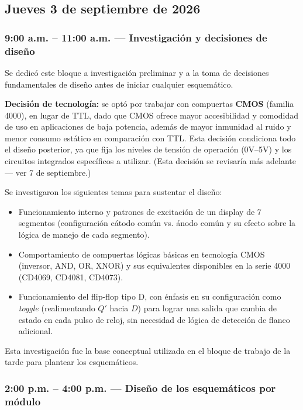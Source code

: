 \documentclass[11pt]{article}
\begin{document}
\subsection{Jueves 3 de septiembre de 2026}

\subsubsection{9:00 a.m. -- 11:00 a.m. --- Investigación y decisiones de diseño}

Se dedicó este bloque a investigación preliminar y a la toma de decisiones
fundamentales de diseño antes de iniciar cualquier esquemático.

\textbf{Decisión de tecnología:} se optó por trabajar con compuertas
\textbf{CMOS} (familia 4000), en lugar de TTL, dado que CMOS ofrece mayor
accesibilidad y comodidad de uso en aplicaciones de baja potencia, además
de mayor inmunidad al ruido y menor consumo estático en comparación con
TTL. Esta decisión condiciona todo el diseño posterior, ya que fija los
niveles de tensión de operación (0V--5V) y los circuitos integrados
específicos a utilizar. (Esta decisión se revisaría más adelante --- ver
7 de septiembre.)

Se investigaron los siguientes temas para sustentar el diseño:
\begin{itemize}[nosep]
    \item Funcionamiento interno y patrones de excitación de un display de
    7 segmentos (configuración cátodo común vs. ánodo común y su efecto
    sobre la lógica de manejo de cada segmento).
    \item Comportamiento de compuertas lógicas básicas en tecnología CMOS
    (inversor, AND, OR, XNOR) y sus equivalentes disponibles en la serie
    4000 (CD4069, CD4081, CD4073).
    \item Funcionamiento del flip-flop tipo D, con énfasis en su
    configuración como \emph{toggle} (realimentando $Q'$ hacia $D$) para
    lograr una salida que cambia de estado en cada pulso de reloj, sin
    necesidad de lógica de detección de flanco adicional.
\end{itemize}

Esta investigación fue la base conceptual utilizada en el bloque de
trabajo de la tarde para plantear los esquemáticos.

\subsubsection{2:00 p.m. -- 4:00 p.m. --- Diseño de los esquemáticos por módulo}
\end{document}
